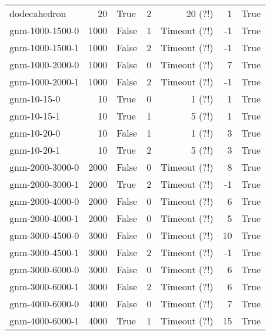 \begin{longtable}{lrlrrrl}
dodecahedron & 20 & True & 2 & 20 (?!) & 1 & True \\

gnm-1000-1500-0 & 1000 & False & 1 & Timeout (?!) & -1 & True \\

gnm-1000-1500-1 & 1000 & False & 2 & Timeout (?!) & -1 & True \\

gnm-1000-2000-0 & 1000 & False & 0 & Timeout (?!) & 7 & True \\

gnm-1000-2000-1 & 1000 & False & 2 & Timeout (?!) & -1 & True \\

gnm-10-15-0 & 10 & True & 0 & 1 (?!) & 1 & True \\

gnm-10-15-1 & 10 & True & 1 & 5 (?!) & 1 & True \\

gnm-10-20-0 & 10 & False & 1 & 1 (?!) & 3 & True \\

gnm-10-20-1 & 10 & True & 2 & 5 (?!) & 3 & True \\

gnm-2000-3000-0 & 2000 & False & 0 & Timeout (?!) & 8 & True \\

gnm-2000-3000-1 & 2000 & True & 2 & Timeout (?!) & -1 & True \\

gnm-2000-4000-0 & 2000 & False & 0 & Timeout (?!) & 6 & True \\

gnm-2000-4000-1 & 2000 & False & 0 & Timeout (?!) & 5 & True \\

gnm-3000-4500-0 & 3000 & False & 0 & Timeout (?!) & 10 & True \\

gnm-3000-4500-1 & 3000 & False & 2 & Timeout (?!) & -1 & True \\

gnm-3000-6000-0 & 3000 & False & 0 & Timeout (?!) & 6 & True \\

gnm-3000-6000-1 & 3000 & False & 2 & Timeout (?!) & 6 & True \\

gnm-4000-6000-0 & 4000 & False & 0 & Timeout (?!) & 7 & True \\

gnm-4000-6000-1 & 4000 & True & 1 & Timeout (?!) & 15 & True \\


\end{longtable}

